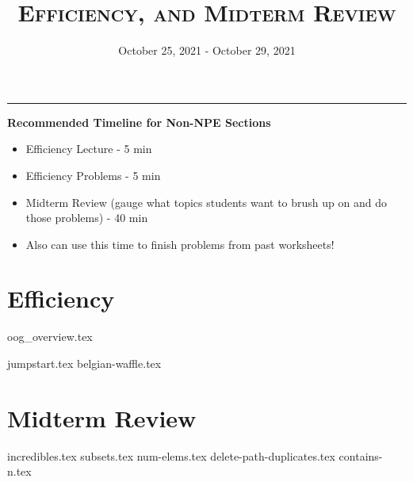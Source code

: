 \documentclass{exam}
\title{\textsc{Efficiency, and Midterm Review}}
\date{October 25, 2021 - October 29, 2021}
\begin{document}
\maketitle
\rule{\textwidth}{0.15em}
\fontsize{12}{15}\selectfont

\begin{guide}
    \textbf{Recommended Timeline for Non-NPE Sections}
    \begin{itemize}
        \item Efficiency Lecture - 5 min
        \item Efficiency Problems - 5 min
        \item Midterm Review (gauge what topics students want to brush up on and do those problems) - 40 min
        \item Also can use this time to finish problems from past worksheets!
    \end{itemize}
\end{guide}

\section{Efficiency}
{oog_overview.tex}
\begin{questions}
    {jumpstart.tex}
    {belgian-waffle.tex}
\end{questions}

\newpage
\section{Midterm Review}
\begin{questions}
    {incredibles.tex}
    {subsets.tex}
    \newpage
    {num-elems.tex}
    \newpage
    {delete-path-duplicates.tex}
    {contains-n.tex}
\end{questions}
\end{document}
